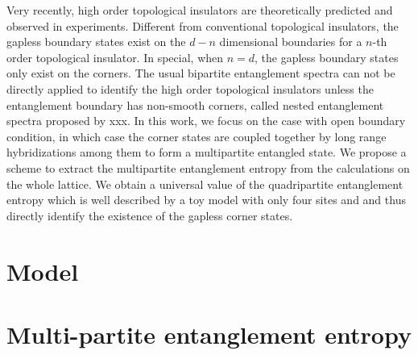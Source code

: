 \documentclass[aps,twocolumn,superscriptaddress]{revtex4-1}
\begin{document}
Very recently, high order topological insulators are theoretically predicted and observed in experiments.
\cite{}
Different from conventional topological insulators, the gapless boundary states exist on the $d-n$ dimensional
boundaries for a $n$-th order topological insulator. In special, when $n=d$, the gapless boundary states only exist on
the corners. The usual bipartite entanglement spectra can not be directly applied to identify the high order 
topological insulators unless the entanglement boundary has non-smooth corners, called nested entanglement spectra
proposed by xxx.\cite{}
In this work, we focus on the case with open boundary condition, in which case the corner states are coupled together by
long range hybridizations among them to form a multipartite entangled state. We propose a scheme to extract the 
multipartite entanglement entropy from the calculations on the whole lattice. We obtain a universal value of the 
quadripartite entanglement entropy which is well described by a toy model with only four sites and and thus directly 
identify the existence of the gapless corner states. 



\section{Model}

\section{Multi-partite entanglement entropy}
\end{document}
